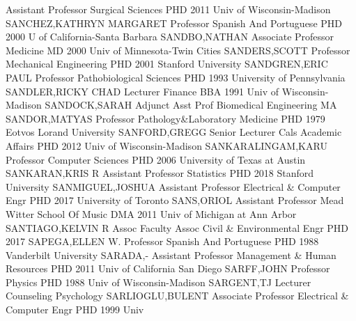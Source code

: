 \documentclass[
]{article}
\begin{document}
\textbar{}  \textbar Assistant Professor \textbar Surgical
Sciences \textbar PHD 2011 Univ of Wisconsin-Madison
\textbar SANCHEZ,KATHRYN MARGARET \textbar{} 
\textbar Professor \textbar Spanish And Portuguese \textbar PHD 2000 U
of California-Santa Barbara \textbar SANDBO,NATHAN \textbar{}
 \textbar Associate Professor \textbar Medicine \textbar MD
2000 Univ of Minnesota-Twin Cities \textbar SANDERS,SCOTT \textbar{}
 \textbar Professor \textbar Mechanical Engineering
\textbar PHD 2001 Stanford University \textbar SANDGREN,ERIC PAUL
\textbar{}  \textbar Professor \textbar Pathobiological
Sciences \textbar PHD 1993 University of Pennsylvania
\textbar SANDLER,RICKY CHAD \textbar{}  \textbar Lecturer
\textbar Finance \textbar BBA 1991 Univ of Wisconsin-Madison
\textbar SANDOCK,SARAH \textbar{}  \textbar Adjunct Asst
Prof \textbar Biomedical Engineering \textbar MA \textbar SANDOR,MATYAS
\textbar{}  \textbar Professor
\textbar Pathology\&Laboratory Medicine \textbar PHD 1979 Eotvos Lorand
University \textbar SANFORD,GREGG \textbar{} 
\textbar Senior Lecturer \textbar Cals Academic Affairs \textbar PHD
2012 Univ of Wisconsin-Madison \textbar SANKARALINGAM,KARU \textbar{}
 \textbar Professor \textbar Computer Sciences \textbar PHD
2006 University of Texas at Austin \textbar SANKARAN,KRIS R \textbar{}
 \textbar Assistant Professor \textbar Statistics
\textbar PHD 2018 Stanford University \textbar SANMIGUEL,JOSHUA
\textbar{}  \textbar Assistant Professor \textbar Electrical
\& Computer Engr \textbar PHD 2017 University of Toronto
\textbar SANS,ORIOL \textbar{}  \textbar Assistant Professor
\textbar Mead Witter School Of Music \textbar DMA 2011 Univ of Michigan
at Ann Arbor \textbar SANTIAGO,KELVIN R \textbar{} 
\textbar Assoc Faculty Assoc \textbar Civil \& Environmental Engr
\textbar PHD 2017 \textbar SAPEGA,ELLEN W. \textbar{} 
\textbar Professor \textbar Spanish And Portuguese \textbar PHD 1988
Vanderbilt University \textbar SARADA,- \textbar{} 
\textbar Assistant Professor \textbar Management \& Human Resources
\textbar PHD 2011 Univ of California San Diego \textbar SARFF,JOHN
\textbar{}  \textbar Professor \textbar Physics \textbar PHD
1988 Univ of Wisconsin-Madison \textbar SARGENT,TJ \textbar{}
 \textbar Lecturer \textbar Counseling Psychology
\textbar SARLIOGLU,BULENT \textbar Associate Professor \textbar{}
 \textbar Electrical \& Computer Engr \textbar PHD 1999 Univ
\end{document}
